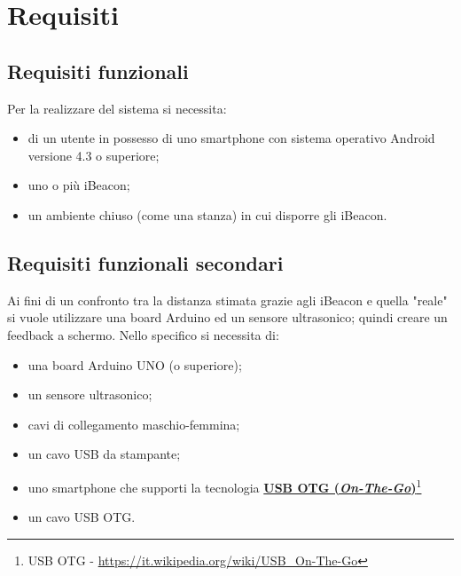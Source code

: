 \chapter{Requisiti}

\section{Requisiti funzionali}
Per la realizzare del sistema si necessita:
\begin{itemize}
	\item di un utente in possesso di uno smartphone con sistema operativo Android versione 4.3 o superiore;
	
	\item uno o più iBeacon;
	
	\item un ambiente chiuso (come una stanza) in cui disporre gli iBeacon.
\end{itemize}

\section{Requisiti funzionali secondari}
Ai fini di un confronto tra la distanza stimata grazie agli iBeacon e quella "reale" si vuole utilizzare una board Arduino ed un sensore ultrasonico; quindi creare un feedback a schermo. 
Nello specifico si necessita di:
\begin{itemize}
	\item una board Arduino UNO (o superiore);
	
	\item un sensore ultrasonico;
	
	\item cavi di collegamento maschio-femmina;
	
	\item un cavo USB da stampante;
	
	\item uno smartphone che supporti la tecnologia \href{https://it.wikipedia.org/wiki/USB_On-The-Go}{\textbf{USB OTG (\textit{On-The-Go})}}\footnote{USB OTG - \url{https://it.wikipedia.org/wiki/USB_On-The-Go}}
	
	\item un cavo USB OTG.
\end{itemize}

